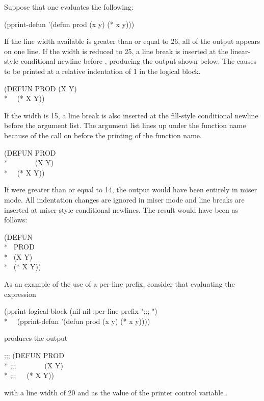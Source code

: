 Suppose that one evaluates the following:
\begin{lisp}
(pprint-defun '(defun prod (x y) (* x y)))
\end{lisp}

If the line width available is greater than or equal to 26, all of the
output appears on one line.  If the width is reduced to 25,
a line break is inserted at the linear-style conditional newline before
, producing the output shown below.  The
 causes  to be printed at a relative
indentation of 1 in the logical block.
\begin{lisp}
(DEFUN PROD (X Y)  \\*
~~(* X Y))
\end{lisp}

If the width is 15, a line break is also inserted at the
fill-style conditional newline before the argument list.  The argument list lines
up under the function name because of the call on
 before the printing of the function name. 
\begin{lisp}
(DEFUN PROD \\*
~~~~~~~(X Y) \\*
~~(* X Y))
\end{lisp}

If  were greater than or equal to 14,
the output would have been entirely in miser mode.
All indentation changes are
ignored in miser mode and line breaks are inserted at miser-style
conditional newlines.  The result would have been as follows:
\begin{lisp}
(DEFUN \\*
~PROD \\*
~(X Y) \\*
~(* X Y))
\end{lisp}

As an example of the use of a per-line prefix, consider that evaluating the expression
\begin{lisp}
(pprint-logical-block (nil nil :per-line-prefix ";;; ") \\*
~~(pprint-defun '(defun prod (x y) (* x y))))
\end{lisp}
produces the output
\begin{lisp}
;;; (DEFUN PROD \\*
;;;~~~~~~~~(X Y) \\*
;;;~~~(* X Y))
\end{lisp}
with a line width of 20 and  as the value
of the printer control variable .

